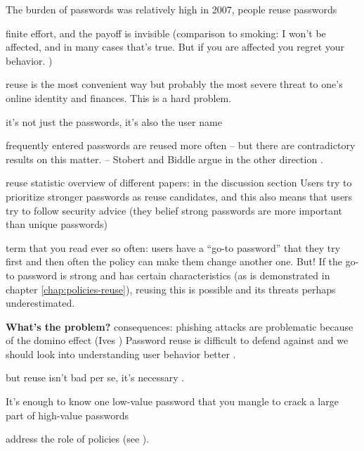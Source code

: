 	The burden of passwords was relatively high in 2007, people reuse passwords \cite{Florencio2007LargeScaleStudyPasswordHabits}
	
	finite effort, and the payoff is invisible (comparison to smoking: I won't be affected, and in many cases that's true. But if you are affected you regret your behavior. )
	
	reuse is the most convenient way but probably the most severe threat to one's online identity and finances. This is a hard problem. 
	
	it's not just the passwords, it's also the user name 
	
	frequently entered passwords are reused more often \cite{Wash2016UnderstandingPasswordChoices} -- but there are contradictory results on this matter. -- Stobert and Biddle argue in the other direction \cite{Stobert2014PasswordLifeCycle}. 
	
	reuse statistic overview of different papers: 
	\cite{Wash2016UnderstandingPasswordChoices} in the discussion section
	Users try to prioritize stronger passwords as reuse candidates, and this also means that users try to follow security advice (they belief strong passwords are more important than unique passwords) \cite{Wash2016UnderstandingPasswordChoices}
	
	term that you read ever so often: users have a ``go-to password'' that they try first
	and then often the policy can make them change another one. But! If the go-to password is strong and has certain characteristics (as is demonstrated in chapter \ref{chap:policies-reuse}), reusing this is possible and its threats perhaps underestimated. 
	
	\textbf{What's the problem?}
	consequences: phishing attacks are problematic because of the domino effect (Ives \etal) Password reuse is difficult to defend against and we should look into understanding user behavior better \cite{Ives2004DominoEffectReuse}.
	
	but reuse isn't bad per se, it's necessary \cite{Florencio2014PasswordPortfoliosFiniteUser, ZhangKennedy2016RevisitingPasswordRules}. 
	

	
	
	It's enough to know one low-value password that you mangle to crack a large part of high-value passwords \cite{Haque2014Hierarchy}
	
	
	address the role of policies (see \cite{Seitz2017PoliciesReuse}).
	
